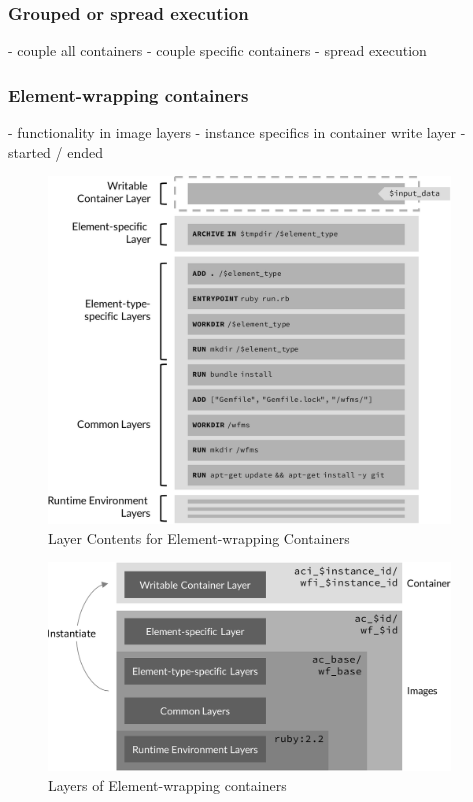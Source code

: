   \subsubsection{Grouped or spread execution} %
  \label{ssub:grouped_or_spread_execution}
    - couple all containers
    - couple specific containers
    - spread execution

  \subsubsection{Element-wrapping containers} %
  \label{ssub:element_wrapping_containers}
    - functionality in image layers
    - instance specifics in container write layer
    - started / ended

    \begin{figure}[htbp]
      \centering
      \includegraphics[width=0.95\textwidth]{content/images/execution_container-crop.pdf}
      \caption{Layer Contents for Element-wrapping Containers}
      \label{fig:layers_for_element_wrapping_containers}
    \end{figure}

    \begin{figure}[htbp]
      \centering
      \includegraphics[width=0.95\textwidth]{content/images/layer_concept-crop.pdf}
      \caption{Layers of Element-wrapping containers}
      \label{fig:layers_for_element_wrapping_containers}
    \end{figure}


